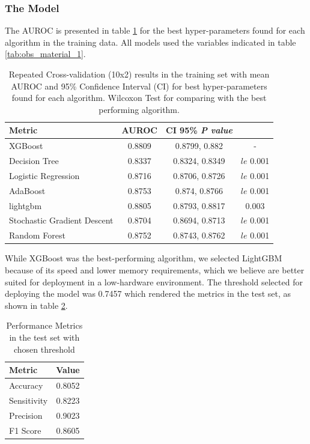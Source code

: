 \subsubsection{The Model}
The AUROC is presented in table \ref{tab:performancemetricsauc} for the best hyper-parameters found for each algorithm in the training data. All models used the variables indicated in table \ref{tab:obs_material_1}.
\begin{table}[htbp]
  \centering
  \caption[Performance Metrics in the training set]{Repeated Cross-validation (10x2) results in the training set with mean AUROC and 95\% Confidence Interval (CI) for best hyper-parameters found for each algorithm. Wilcoxon Test for comparing with the best performing algorithm.}
  \label{tab:performancemetricsauc}
  \renewcommand{\arraystretch}{1.5} %
  \setlength{\tabcolsep}{12pt} %
  \begin{tabular}{lccc}
    \hline
    \textbf{Metric} & \textbf{AUROC} & \textbf{CI 95\%} \textit{\textbf{P value}} \\
    \hline
    XGBoost & 0.8809 & 0.8799, 0.882 & - \\  
    Decision Tree & 0.8337 & 0.8324, 0.8349 & $le$ 0.001\\
    Logistic Regression & 0.8716 & 0.8706, 0.8726 & $le$ 0.001\\
    AdaBoost & 0.8753 & 0.874, 0.8766 & $le$ 0.001\\ 
    lightgbm & 0.8805 & 0.8793, 0.8817 &  0.003\\ 
    Stochastic Gradient Descent & 0.8704 & 0.8694, 0.8713& $le$ 0.001\\ 
    Random Forest & 0.8752 & 0.8743, 0.8762& $le$ 0.001 \\  
    \hline
  \end{tabular}
\end{table}
While XGBoost was the best-performing algorithm, we selected LightGBM  \cite{lightgbm} because of its speed and lower memory requirements, which we believe are better suited for deployment in a low-hardware environment. The threshold selected for deploying the model was 0.7457 which rendered the metrics in the test set, as shown in table \ref{tab:performancemetricsthreshold}.

\begin{table}[htbp]
  \centering
\caption{Performance Metrics in the test set with chosen threshold}
\label{tab:performancemetricsthreshold}
\renewcommand{\arraystretch}{1.5} %
\setlength{\tabcolsep}{12pt} %
\begin{tabular}{lc}
    \hline
    \textbf{Metric} & \textbf{Value} \\
    \hline
    Accuracy & 0.8052 \\
    Sensitivity & 0.8223 \\
    Precision & 0.9023 \\
    F1 Score & 0.8605 \\
    \hline
  \end{tabular}
\end{table}




